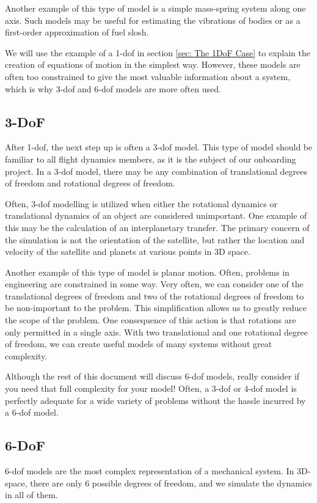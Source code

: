 \documentclass[12pt]{report}
\begin{document}
Another example of this type of model is a simple mass-spring system along one axis. Such models may be useful for estimating the vibrations of bodies or as a first-order approximation of fuel slosh.

We will use the example of a 1-\gls{dof} in section \ref{sec: The 1DoF Case} to explain the creation of equations of motion in the simplest way. However, these models are often too constrained to give the most valuable information about a system, which is why 3-\gls{dof} and 6-\gls{dof} models are more often used.
\subsection{3-DoF}
After 1-\gls{dof}, the next step up is often a 3-\gls{dof} model. This type of model should be familiar to all flight dynamics members, as it is the subject of our onboarding project. In a 3-\gls{dof} model, there may be any combination of translational degrees of freedom and rotational degrees of freedom.

Often, 3-\gls{dof} modelling is utilized when either the rotational dynamics or translational dynamics of an object are considered unimportant. One example of this may be the calculation of an interplanetary transfer. The primary concern of the simulation is not the orientation of the satellite, but rather the location and velocity of the satellite and planets at various points in 3D space. 

Another example of this type of model is planar motion. Often, problems in engineering are constrained in some way. Very often, we can consider one of the translational degrees of freedom and two of the rotational degrees of freedom to be non-important to the problem. This simplification allows us to greatly reduce the scope of the problem. One consequence of this action is that rotations are only permitted in a single axis. With two translational and one rotational degree of freedom, we can create useful models of many systems without great complexity.

Although the rest of this document will discuss 6-\gls{dof} models, really consider if you need that full complexity for your model! Often, a 3-\gls{dof} or 4-\gls{dof} model is perfectly adequate for a wide variety of problems without the hassle incurred by a 6-\gls{dof} model. 
\subsection{6-DoF}
6-\gls{dof} models are the most complex representation of a mechanical system. In 3D-space, there are only 6 possible degrees of freedom, and we simulate the dynamics in all of them.
\end{document}
